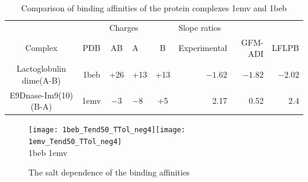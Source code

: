 \begin{table}[!ht]
\begin{tabular}{ccclcrrr}
\hline
\multicolumn{2}{c}{}           & \multicolumn{3}{l}{Charges} & \multicolumn{3}{l}{Slope ratios} \\
Complex                 & PDB  & AB       & A       & B      & Experimental & GFM-ADI & LFLPB   \\ \hline
Lactoglobulin dime(A-B) & 1beb & +26      & +13     & +13    & $-1.62$      & $-1.82$ & $-2.02$ \\ %
E9Dnase-Im9(10)(B-A)    & 1emv & $-3$     & $-8$    & +5     & 2.17         & 0.52    & 2.4     \\ \hline
\end{tabular}
\caption{Comparison of binding affinities of the protein complexes 1emv and 1beb}
\label{tab_salt_effect}
\end{table}



\begin{figure}[!ht]
\begin{center}
\texttt{[image: 1beb\_Tend50\_TTol\_neg4]}\texttt{[image: 1emv\_Tend50\_TTol\_neg4]}\\
1beb \hskip 2.7in 1emv
\end{center}
\caption{The salt dependence of the binding affinities}
\label{fig_salt_effect}
\end{figure}
